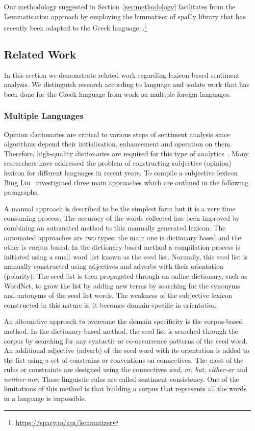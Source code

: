 Our methodology suggested in Section~\ref{sec:methodology} facilitates
from the Lemmatisation approach
by employing the lemmatiser of spaCy library
that has recently been adapted to the Greek language~.\footnote{ \url{https://spacy.io/api/lemmatizer}}

\subsection{Related Work}
\label{subsec:related}

In this section we demonstrate related work regarding lexicon-based sentiment analysis.
We distinguish research according to language and isolate work
that has been done for the Greek language
from work on multiple foreign languages.

\subsubsection{Multiple Languages}
\label{subsubsec:multiple}

Opinion dictionaries are critical to various steps of sentiment analysis
since algorithms depend their initialisation, enhancement and operation on them. Therefore, high-quality dictionaries are required
for this type of analytics~\cite{AKKN14}. 
Many researchers have addressed the problem
of constructing subjective (opinion) lexicon for different languages in recent years.
To compile a subjective lexicon Bing Liu~\cite{Liu10} investigated three main approaches
which are outlined in the following paragraphs.

A manual approach is described to be the simplest form
but it is a very time consuming process.
The accuracy of the words collected has been improved
by combining an automated method to this manually generated lexicon.
The automated approaches are two types;
the main one is dictionary based and the other is corpus based.
In the dictionary-based method a compilation process is initiated
using a small word list known as the seed list.
Normally, this seed list is manually constructed using adjectives and adverbs
with their orientation (polarity).
The seed list is then propagated through an online dictionary,
such as WordNet, to grow the list by adding new terms
by searching for the synonyms and antonyms of the seed list words.
The weakness of the subjective lexicon constructed in this nature is,
it becomes domain-specific in orientation.

An alternative approach to overcome the domain specificity is the corpus-based method.
In the dictionary-based method, the seed list is searched through the corpus
by searching for any syntactic or co-occurrence patterns of the seed word.
An additional adjective (adverb) of the seed word with its orientation is added
to the list using a set of constrains or conventions on connectives.
The most of the rules or constraints are designed using the connectives \emph{and}, \emph{or}, \emph{but}, \emph{either-or} and \emph{neither-nor}.
These linguistic rules are called sentiment consistency.
One of the limitations of this method is
that building a corpus that represents all the words in a language is impossible.

